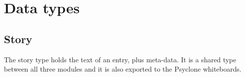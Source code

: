 \section{\label{sct:types}Data types}

\subsection{Story}

The story type holds the text of an entry, plus meta-data. It is a shared type
between all three modules and it is also exported to the Psyclone whiteboards.


